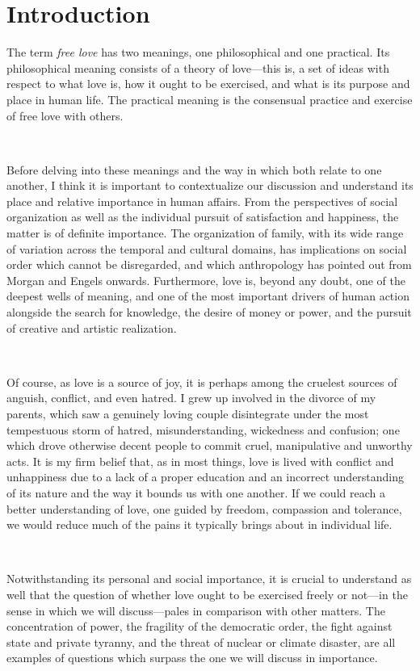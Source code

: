 \documentclass[a4paper, 12pt]{article}
\begin{document}
\section{Introduction}

The term \textit{free love} has two meanings, one philosophical and one
practical. Its philosophical meaning consists of a theory of
love---this is, a set of ideas with respect to what love is, how it ought to be
exercised, and what is its purpose and place in human life. 
The practical meaning is the consensual practice and exercise of free love with
others.

~ 

Before delving into these meanings and the way in which both relate to one
another, I think it is important to contextualize our discussion and understand
its place and relative importance in human affairs. From the perspectives of
social organization as well as the individual pursuit of satisfaction and
happiness, the matter is of definite importance. The organization of family,
with its wide range of variation across the temporal and cultural domains, has
implications on social order which cannot be disregarded, and which
anthropology has pointed out from Morgan and Engels onwards. Furthermore, love
is, beyond any doubt, one of the deepest wells of meaning, and one of the most
important drivers of human action alongside the search for knowledge, the
desire of money or power, and the pursuit of creative and artistic realization. 

~ 

Of course, as love is a source of joy, it is perhaps among the cruelest sources
of anguish, conflict, and even hatred. I grew up involved in the divorce of my
parents, which saw a genuinely loving couple disintegrate under the most
tempestuous storm of hatred, misunderstanding, wickedness and confusion; one
which drove otherwise decent people to commit cruel, manipulative
and unworthy acts. It is my firm belief that, as in most things, love is lived
with conflict and unhappiness due to a lack of a proper education and an
incorrect understanding of its nature and the way it bounds us with one
another. If we could reach a better understanding of love, one guided by
freedom, compassion and tolerance, we would reduce much of the pains it
typically brings about in individual life.

~

Notwithstanding its personal and social importance, it is crucial to understand
as well that the question of whether love ought to be exercised freely or
not---in the sense in which we will discuss---pales in comparison with other
matters. The concentration of power, the fragility of the democratic order, the
fight against state and private tyranny, and the threat of nuclear or climate
disaster, are all examples of questions which surpass the one we will discuss
in importance. 
\end{document}
